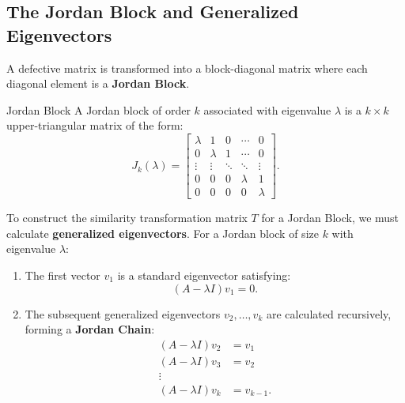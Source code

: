 \subsection{The Jordan Block and Generalized Eigenvectors}
A defective matrix is transformed into a block-diagonal matrix where each diagonal element is a \textbf{Jordan Block}.
\begin{mydefinition}{Jordan Block}
A Jordan block of order $k$ associated with eigenvalue $\lambda$ is a $k \times k$ upper-triangular matrix of the form:
\begin{equation}
    J_k(\lambda) = \begin{bmatrix}
        \lambda & 1 & 0 & \cdots & 0 \\
        0 & \lambda & 1 & \cdots & 0 \\
        \vdots & \vdots & \ddots & \ddots & \vdots \\
        0 & 0 & 0 & \lambda & 1 \\
        0 & 0 & 0 & 0 & \lambda
\end{bmatrix} .
\end{equation}
\end{mydefinition}
To construct the similarity transformation matrix $T$ for a Jordan Block, we must calculate \textbf{generalized eigenvectors}.
For a Jordan block of size $k$ with eigenvalue $\lambda$:
\begin{enumerate}
    \item The first vector $v_1$ is a standard eigenvector satisfying:
    \begin{equation}
(A - \lambda I) v_1 = 0 .
    \end{equation}
    \item The subsequent generalized eigenvectors $v_2, \dots, v_k$ are calculated recursively, forming a \textbf{Jordan Chain}:
    \begin{align}
        (A - \lambda I) v_2 &= v_1 \\
        (A - \lambda I) v_3 &= v_2 \\
        \vdots \nonumber \\
(A - \lambda I) v_k &= v_{k-1} .
    \end{align}
\end{enumerate}

